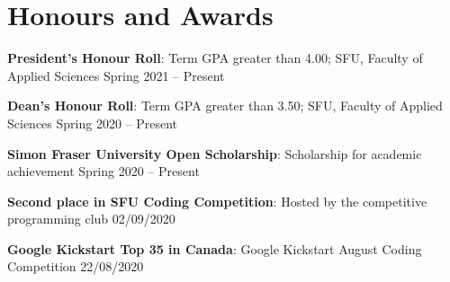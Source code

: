 \documentclass[letterpaper, 11pt]{article}
\newcommand{\resumeItemDate}[3]{
  \small{
    \textbf{#1}{: #2} \hfill #3 \vspace{5pt} \\
  }
}
\begin{document}
\vspace{-10pt}
\section{Honours and Awards}
	\resumeItemDate{President's Honour Roll}
	{Term GPA greater than 4.00; SFU, Faculty of Applied Sciences}
	{Spring 2021 -- Present}
    \resumeItemDate{Dean's Honour Roll}
	{Term GPA greater than 3.50; SFU, Faculty of Applied Sciences}
	{Spring 2020 -- Present}
    \resumeItemDate{Simon Fraser University Open Scholarship}
	{Scholarship for academic achievement}
	{Spring 2020 -- Present}
    \resumeItemDate{Second place in SFU Coding Competition}
	{Hosted by the competitive programming club}
	{02/09/2020}
    \resumeItemDate{Google Kickstart Top 35 in Canada}
	{Google Kickstart August Coding Competition}
	{22/08/2020}
\end{document}
